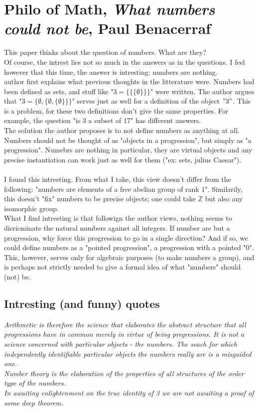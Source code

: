 \documentclass[11pt]{article}
\theoremstyle{definition}
\theoremstyle{example}
\theoremstyle{lemma}
\theoremstyle{proposition}
\theoremstyle{theorem}
\begin{document}
\section{Philo of Math, \textit{What numbers could not be}, Paul Benacerraf}
This paper thinks about the question of numbers. What are they?\\
Of course, the intrest lies not so much in the answers as in the questions. I feel however that this time, the answer is intresting: numbers are nothing.\\
author first explains what previous thoughts in the litterature were. Numbers had been defined as sets, and stuff like "$3 = \{ \{ \{\emptyset\}\}\}$" were written. The author argues that "$3 = \{\emptyset, \{\emptyset, \{\emptyset\}\}\}$" serves just as well for a definition of the object $"3"$. This is a problem, for these two definitions don't give the same properties. For example, the question "is 3 a subset of 17" has different answers.\\
The solution the author proposes is to not define numbers as anything at all. Numbers should not be thought of as "objects in a progression", but simply as "a progression". Numebrs are nothing in particular, they are virtual objects and any precise instantiation can work just as well for them ("ex: sets, julius Caesar").\\ \\

I found this intresting. From what I take, this view doesn't differ from the following: "numbers are elements of a free abelian group of rank $1$". Similarily, this doesn't "fix" numbers to be precise objects; one could take $\mathbb{Z}$ but also any isomorphic group.\\
What I find intresting is that followign the author views, nothing seems to disricminate the natural numbers against all integers. If number are but a progression, why force this progression to go in a single direction? And if so, we could define numbers as a "pointed progression", a progression with a pointed "$0$". This, however, serves only for algebraic purposes (to make numbers a group), and is perhaps not strictly needed to give a formal idea of what "numbers" should (not) be.

\subsection{Intresting (and funny) quotes}
\textit{Arithmetic is therefore the science that elaborates the abstract structure that all progressions have in common merely in virtue of being pregressions. It is not a science concerned with particular objects - the numbers. The seach for which independently identifiable particular objects the numbers really are is a misguided one.}\\ 

\textit{Number theory is the elaboration of the properties of all structures of the order type of the numbers.}\\

\textit{In awaiting enlightenment on the true identity of 3 we are not awaiting a proof of some deep theorem.}
\end{document}

